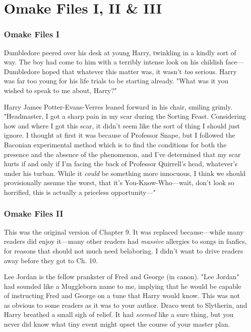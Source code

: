 \chapter{Omake Files I, II \& III}

\subsection{Omake Files I}
Dumbledore peered over his desk at young Harry, twinkling in a kindly sort of
way. The boy had come to him with a terribly intense look on his childish
face—Dumbledore hoped that whatever this matter was, it wasn't \emph{too}
serious. Harry was far too young for his life trials to be starting already.
"What was it you wished to speak to me about, Harry?"

Harry James Potter-Evans-Verres leaned forward in his chair, smiling grimly.
"Headmaster, I got a sharp pain in my scar during the Sorting Feast.
Considering how and where I got this scar, it didn't seem like the sort of
thing I should just ignore. I thought at first it was because of Professor
Snape, but I followed the Baconian experimental method which is to find the
conditions for both the presence and the absence of the phenomenon, and I've
determined that my scar hurts if and only if I'm facing the back of Professor
Quirrell's head, whatever's under his turban. While it \emph{could} be
something more innocuous, I think we should provisionally assume the worst,
that it's You-Know-Who—wait, don't look so horrified, this is actually a
priceless opportunity—"
\sbreak
\vspace{-2\baselineskip}
\subsection{Omake Files II}
This was the original version of Chapter 9. It was replaced because—while
many readers did enjoy it—many other readers had \emph{massive} allergies to
songs in fanfics, for reasons that should not much need belaboring. I didn't
want to drive readers away before they got to Ch. 10.

Lee Jordan is the fellow prankster of Fred and George (in canon). "Lee Jordan"
had sounded like a Muggleborn name to me, implying that he would be capable of
instructing Fred and George on a tune that Harry would know. This was not as
obvious to some readers as it was to your author.
\sbreak
Draco went to Slytherin, and Harry breathed a small sigh of relief. It had
\emph{seemed} like a sure thing, but you never did know what tiny event might
upset the course of your master plan.

